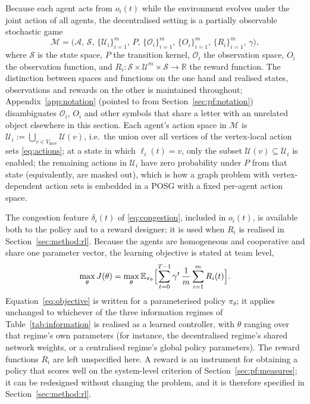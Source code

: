 \documentclass[../main.tex]{subfiles}
\begin{document}
Because each agent acts from $o_i(t)$ while the environment evolves under the
joint action of all agents, the decentralised setting is a partially observable
stochastic game
\begin{equation}
  \mathcal{M} = \bigl( \mathcal{A},\, \mathcal{S},\, \{\mathcal{U}_i\}_{i=1}^{m},\,
                       P,\, \{\mathcal{O}_i\}_{i=1}^{m},\, \{O_i\}_{i=1}^{m},\,
                       \{R_i\}_{i=1}^{m},\, \gamma \bigr),
  \label{eq:posg}
\end{equation}
where $\mathcal{S}$ is the state space, $P$ the transition kernel,
$\mathcal{O}_i$ the observation space, $O_i$ the observation function, and
$R_i : \mathcal{S} \times \mathcal{U}^m \times \mathcal{S} \to \mathbb{R}$ the
reward function. The distinction between spaces and functions on the one hand and
realised states, observations and rewards on the other is maintained throughout;
Appendix~\ref{app:notation} (pointed to from Section~\ref{sec:pf:notation})
disambiguates $\mathcal{O}_i$, $O_i$ and other symbols that share a letter with
an unrelated object elsewhere in this section.
Each agent's action space in $\mathcal{M}$ is %
$\mathcal{U}_i := \bigcup_{v \in V_{\mathrm{mov}}} \mathcal{U}(v)$, i.e.\ the
union over all vertices of the vertex-local action sets \eqref{eq:actions};
at a state in which $\ell_i(t) = v$, only the subset $\mathcal{U}(v) \subseteq
\mathcal{U}_i$ is enabled; the remaining actions in $\mathcal{U}_i$ have zero
probability under $P$ from that state (equivalently, are masked out), which is
how a graph problem with vertex-dependent action sets is embedded in a POSG with
a fixed per-agent action space.

The congestion feature $\delta_i(t)$ of \eqref{eq:congestion}, included in %
$o_i(t)$, is available both to the policy and to a reward designer; it is used
when $R_i$ is realised in Section~\ref{sec:method:rl}.
Because the agents are homogeneous and cooperative and share one parameter
vector, the learning objective is stated at team level,
\begin{equation}
  \max_{\theta} J(\theta)
    = \max_{\theta} \mathbb{E}_{\pi_\theta}
      \Bigl[ \sum_{t=0}^{T-1} \gamma^{t}\, \frac{1}{m} \sum_{i=1}^{m} R_i(t) \Bigr].
  \label{eq:objective}
\end{equation}
Equation~\eqref{eq:objective} is written for a parameterised policy $\pi_\theta$; %
it applies unchanged to whichever of the three information regimes of
Table~\ref{tab:information} is realised as a learned controller, with $\theta$
ranging over that regime's own parameters (for instance, the decentralised
regime's shared network weights, or a centralised regime's global policy
parameters). The reward functions $R_i$ are left unspecified here. A reward is an
instrument for obtaining a policy that scores well on the system-level criterion
of Section~\ref{sec:pf:measures}; it can be redesigned without changing the
problem, and it is therefore specified in Section~\ref{sec:method:rl}.
\end{document}
